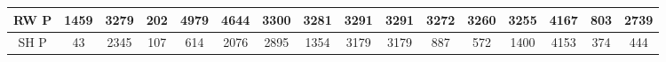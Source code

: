 \begin{table}[H]
\begin{tabular}{|c|c|c|c|c|c|c|c|c|c|c|c|c|c|c|c|}
		RW P  & \cellcolor[HTML]{ECF4FF}1459                                             & \cellcolor[HTML]{ECF4FF}3279                                             & \cellcolor[HTML]{ECF4FF}202                                              & \cellcolor[HTML]{ECF4FF}4979                                            & \cellcolor[HTML]{ECF4FF}4644                                           & \cellcolor[HTML]{ECF4FF}3300                                           & \cellcolor[HTML]{ECF4FF}3281                                           & \cellcolor[HTML]{ECF4FF}3291                                             & \cellcolor[HTML]{ECF4FF}3291                                             & \cellcolor[HTML]{ECF4FF}3272                                             & \cellcolor[HTML]{ECF4FF}3260                                             & \cellcolor[HTML]{ECF4FF}3255                                             & \cellcolor[HTML]{ECF4FF}4167                                             & \cellcolor[HTML]{ECF4FF}803                                              & \cellcolor[HTML]{ECF4FF}2739                                             \\ \hline
		SH P  & \cellcolor[HTML]{CBCEFB}43                                               & \cellcolor[HTML]{CBCEFB}2345                                             & \cellcolor[HTML]{CBCEFB}107                                              & \cellcolor[HTML]{CBCEFB}614                                             & \cellcolor[HTML]{CBCEFB}2076                                           & \cellcolor[HTML]{CBCEFB}2895                                           & \cellcolor[HTML]{CBCEFB}1354                                           & \cellcolor[HTML]{CBCEFB}3179                                             & \cellcolor[HTML]{CBCEFB}3179                                             & \cellcolor[HTML]{CBCEFB}887                                              & \cellcolor[HTML]{CBCEFB}572                                              & \cellcolor[HTML]{CBCEFB}1400                                             & \cellcolor[HTML]{CBCEFB}4153                                             & \cellcolor[HTML]{CBCEFB}374                                              & \cellcolor[HTML]{CBCEFB}444                                              \\ \hline

\end{tabular}
\end{table}
